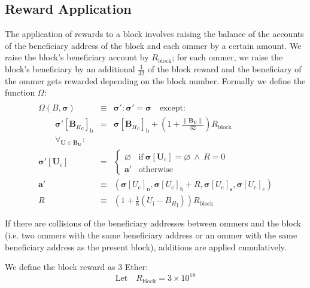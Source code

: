 \documentclass[9pt,oneside]{amsart}
\makeatletter
\newcommand{\linkdest}[1]{\Hy@raisedlink{\hypertarget{#1}{}}}
\makeatother
\begin{document}
\begin{multicols}{2}
\subsection{Reward Application}

The application of rewards to a block involves raising the balance of the accounts of the beneficiary address of the block and each ommer by a certain amount. We raise the block's beneficiary account by \hyperlink{R__block}{$R_{\mathrm{block}}$}; for each ommer, we raise the block's beneficiary by an additional $\frac{1}{32}$ of the block reward and the beneficiary of the ommer gets rewarded depending on the block number.\hypertarget{Omega}{} Formally we define the function $\Omega$:
\begin{eqnarray}
\\ \nonumber
\Omega(B, \boldsymbol{\sigma}) & \equiv & \boldsymbol{\sigma}': \boldsymbol{\sigma}' = \boldsymbol{\sigma} \quad \text{except:} \\
\qquad\boldsymbol{\sigma}'[{\mathbf{B}_{H}}_{\mathrm{c}}]_{\mathrm{b}} & = & \boldsymbol{\sigma}[{\mathbf{B}_{H}}_{\mathrm{c}}]_{\mathrm{b}} + (1 + \frac{\lVert \mathbf{B}_{\mathbf{U}}\rVert}{32})R_{\mathrm{block}} \\
\qquad\forall_{\mathbf{U} \in \mathbf{B}_{\mathbf{U}}}: \\ \nonumber
\boldsymbol{\sigma}'[\mathbf{U}_{\mathrm{c}}] & = & \begin{cases}
\varnothing &\text{if}\ \boldsymbol{\sigma}[\mathbf{U}_{\mathrm{c}}] = \varnothing\ \wedge\ R = 0 \\
\mathbf{a}' &\text{otherwise}
\end{cases} \\
\mathbf{a}' &\equiv& (\boldsymbol{\sigma}[U_{\mathrm{c}}]_{\mathrm{n}}, \boldsymbol{\sigma}[U_{\mathrm{c}}]_{\mathrm{b}} + R, \boldsymbol{\sigma}[U_{\mathrm{c}}]_{\mathbf{s}}, \boldsymbol{\sigma}[U_{\mathrm{c}}]_{\mathrm{c}}) \\
R & \equiv & (1 + \frac{1}{8} (U_{\mathrm{i}} - {B_{H}}_{\mathrm{i}})) R_{\mathrm{block}}
\end{eqnarray}

If there are collisions of the beneficiary addresses between ommers and the block (i.e. two ommers with the same beneficiary address or an ommer with the same beneficiary address as the present block), additions are applied cumulatively.

\hypertarget{block_reward_R__block}{}\linkdest{R__block}We define the block reward as 3 Ether:
\begin{equation}
\text{Let} \quad R_{\mathrm{block}} = 3 \times 10^{18}
\end{equation}


\end{multicols}
\end{document}
